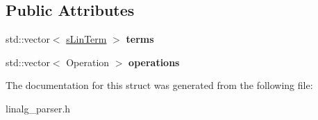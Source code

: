 \subsection*{Public Attributes}
\begin{DoxyCompactItemize}
\item 
\hypertarget{structengine_1_1sLinExpression_a333f81c7cfd7de8274afe6d9274385c4}{std\-::vector$<$ \hyperlink{structengine_1_1sLinTerm}{s\-Lin\-Term} $>$ {\bfseries terms}}\label{structengine_1_1sLinExpression_a333f81c7cfd7de8274afe6d9274385c4}

\item 
\hypertarget{structengine_1_1sLinExpression_a03124741fe628efba92dc0f77a9161fe}{std\-::vector$<$ Operation $>$ {\bfseries operations}}\label{structengine_1_1sLinExpression_a03124741fe628efba92dc0f77a9161fe}

\end{DoxyCompactItemize}


The documentation for this struct was generated from the following file\-:\begin{DoxyCompactItemize}
\item 
linalg\-\_\-parser.\-h\end{DoxyCompactItemize}
